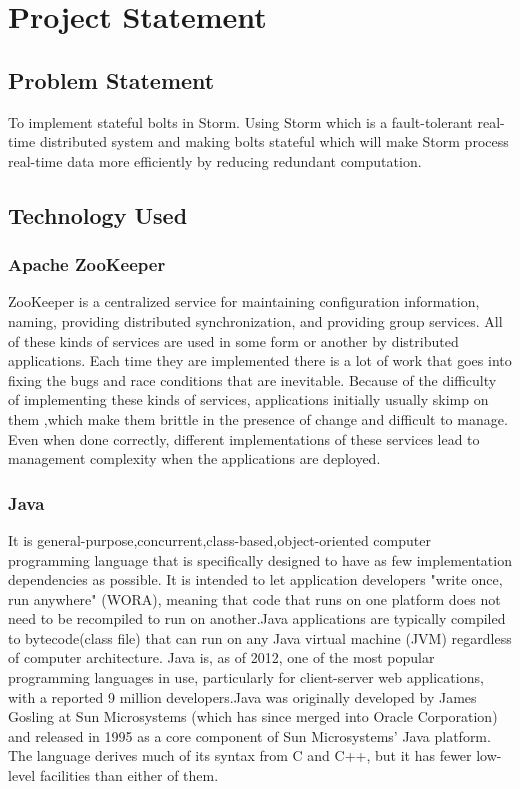 \chapter{Project Statement}
\thispagestyle{plain} 


\section{Problem Statement} 
To implement stateful bolts in Storm. Using Storm which is a fault-tolerant real-time distributed system and making bolts stateful which will make Storm process real-time data more efficiently by reducing redundant computation.

\section{Technology Used}
\subsection{Apache ZooKeeper}
ZooKeeper is a centralized service for maintaining configuration information, naming, providing distributed synchronization, and providing group services. All of these kinds of services are used in some form or another by distributed applications. Each time they are implemented there is a lot of work that goes into fixing the bugs and race conditions that are inevitable. Because of the difficulty of implementing these kinds of services, applications initially usually skimp on them ,which make them brittle in the presence of change and difficult to manage. Even when done correctly, different implementations of these services lead to management complexity when the applications are deployed.
\subsection{Java}
It is general-purpose,concurrent,class-based,object-oriented computer programming language that is specifically designed to have as few implementation dependencies as possible. It is intended to let application developers "write once, run anywhere" (WORA), meaning that code that runs on one platform does not need to be recompiled to run on another.Java applications are typically compiled to bytecode(class file) that can run on any Java virtual machine (JVM) regardless of computer architecture. Java is, as of 2012, one of the most popular programming languages in use, particularly for client-server web applications, with a reported 9 million developers.Java was originally developed by James Gosling at Sun Microsystems (which has since merged into Oracle Corporation) and released in 1995 as a core component of Sun Microsystems' Java platform. The language derives much of its syntax from C and C++, but it has fewer low-level facilities than either of them.
